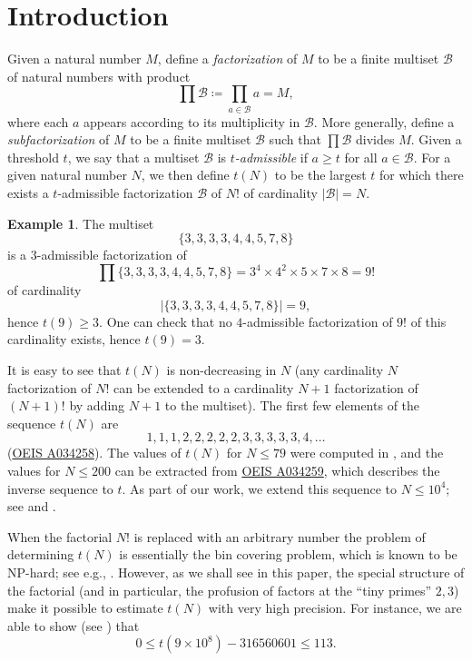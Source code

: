 \documentclass[10pt,a4paper,reqno]{amsart}
\numberwithin{equation}{section}
\theoremstyle{plain}
\theoremstyle{definition}
\newtheorem{example}[theorem]{Example}
\newcommand\tuple{{\mathcal B}}
\begin{document}

\section{Introduction}

Given a natural number $M$, define a \emph{factorization} of $M$ to be a finite multiset $\tuple$ of natural numbers with product
$$ \prod \tuple \coloneqq \prod_{a \in \tuple} a = M,$$
where each $a$ appears according to its multiplicity in $\tuple$. More generally, define a \emph{subfactorization} of $M$ to be a finite multiset $\tuple$ such that $\prod \tuple$ divides $M$.  Given a threshold $t$, we say that a multiset $\tuple$ is \emph{$t$-admissible} if $a \geq t$ for all $a \in \tuple$.  For a given natural number $N$, we then define $t(N)$ to be the largest $t$ for which there exists a $t$-admissible factorization $\tuple$ of $N!$ of cardinality $|\tuple|=N$.

\begin{example}\label{nine}  The multiset
  $$ \{ 3,3,3,3,4,4,5,7,8\}$$
  is a $3$-admissible factorization of 
$$ \prod \{ 3,3,3,3,4,4,5,7,8\} = 3^4 \times 4^2 \times 5 \times 7 \times 8 = 9!$$
of cardinality 
$$|\{ 3,3,3,3,4,4,5,7,8\}| = 9,$$
 hence $t(9) \geq 3$.  One can check that no $4$-admissible factorization of $9!$ of this cardinality exists, hence $t(9) = 3$.
\end{example}

It is easy to see that $t(N)$ is non-decreasing in $N$ (any cardinality $N$ factorization of $N!$ can be extended to a cardinality $N+1$ factorization of $(N+1)!$ by adding $N+1$ to the multiset).  The first few elements of the sequence $t(N)$ are
$$ 1,1,1,2,2,2,2,2,3,3,3,3,3,4, \dots$$
(\href{https://oeis.org/A034258}{OEIS A034258}). The values of $t(N)$ for $N \leq 79$ were computed in \cite{guy-selfridge}, and the values for $N \leq 200$ can be extracted from \href{https://oeis.org/A034259}{OEIS A034259}, which describes the inverse sequence to $t$.  As part of our work, we extend this sequence to $N \leq 10^4$; see \cite{github} and .

When the factorial $N!$ is replaced with an arbitrary number the problem of determining $t(N)$ is essentially the bin covering problem, which is known to be NP-hard; see e.g., \cite{bincover}.  However, as we shall see in this paper, the special structure of the factorial (and in particular, the profusion of factors at the ``tiny primes'' $2,3$) make it possible to estimate $t(N)$ with very high precision.  For instance, we are able to show (see ) that
$$ 0 \leq t(9 \times 10^8) - \num{316560601} \leq 113.$$
\end{document}
